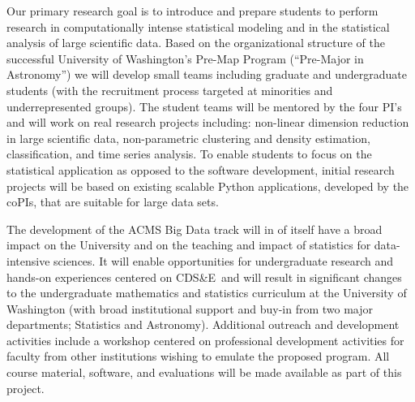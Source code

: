 \documentclass[nofootbib,floatfix,11pt]{article}
\newcommand{\cdse}{CDS\&E}
\begin{document}

Our primary research goal is to introduce and prepare students to
perform research in computationally intense statistical modeling and
in the statistical analysis of large scientific data. Based on the
organizational structure of the successful University of Washington's
Pre-Map Program (``Pre-Major in Astronomy'') we will develop small
teams including graduate and undergraduate students (with the
recruitment process targeted at minorities and underrepresented
groups).  The student teams will be mentored by the four PI's and will
work on real research projects including: non-linear dimension
reduction in large scientific data, non-parametric clustering and
density estimation, classification, and time series analysis. To
enable students to focus on the statistical application as opposed to
the software development, initial research projects will be based on
existing scalable Python applications, developed by the coPIs, that
are suitable for large data sets.


The development of the ACMS Big Data track will in of itself have a
broad impact on the University and on the teaching and impact of
statistics for data-intensive sciences. It will enable opportunities
for undergraduate research and hands-on experiences centered on \cdse\
and will result in significant changes to the undergraduate
mathematics and statistics curriculum at the University of Washington
(with broad institutional support and buy-in from two major
departments; Statistics and Astronomy). Additional outreach and
development activities include a workshop centered on professional
development activities for faculty from other institutions wishing to
emulate the proposed program. All course material, software, and
evaluations will be made available as part of this project. 
\end{document}
